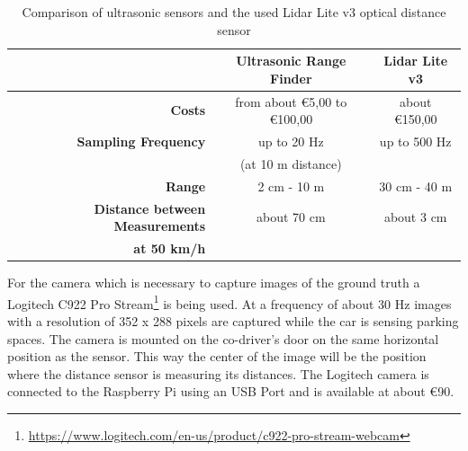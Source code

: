 \begin{table}

\bgroup
\def\arraystretch{1.5}
\begin{tabular}{| r || c | c |}
\hline
   & 
   \textbf{Ultrasonic Range Finder} & 
   \textbf{Lidar Lite v3} \\
\hline
  \textbf{Costs} & 
   from about \euro{5,00} to \euro{100,00} &
   about \euro{150,00} \\
\hline
  \textbf{Sampling Frequency} & 
   up to 20 Hz &
   up to 500 Hz \\
   & (at 10 m distance) & \\
\hline
  \textbf{Range} & 
   2 cm - 10 m &
   30 cm - 40 m \\
\hline
  \textbf{Distance between Measurements} & 
   about 70 cm &
   about 3 cm \\
  \textbf{at 50 km/h} & & \\
\hline

\end{tabular}
\egroup

\caption{Comparison of ultrasonic sensors and the used Lidar Lite v3 optical distance sensor}
\label{table:comparison_us_lidar}
\end{table}

For the camera which is necessary to capture images of the ground truth a Logitech C922 Pro Stream\footnote{\url{https://www.logitech.com/en-us/product/c922-pro-stream-webcam}} is being used. At a frequency of about 30 Hz images with a resolution of 352 x 288 pixels are captured while the car is sensing parking spaces. The camera is mounted on the co-driver's door on the same horizontal position as the sensor. This way the center of the image will be the position where the distance sensor is measuring its distances. The Logitech camera is connected to the Raspberry Pi using an USB Port and is available at about \euro{90}.





%
%
%


